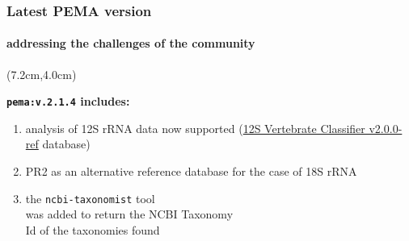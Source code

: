\documentclass{beamer}
\begin{document}
   \begin{frame}
      \frametitle{Latest PEMA version}
      \framesubtitle{addressing the challenges of the community}

      \begin{singlespace}


         \begin{textblock*}{5cm}(7.2cm,4.0cm) %
            
            \scriptsize

            \textbf{\texttt{pema:v.2.1.4} includes:}

            \begin{enumerate}
               \item analysis of 12S rRNA data now supported
                     (\href{https://github.com/terrimporter/12SvertebrateClassifier/releases}{12S Vertebrate Classifier v2.0.0-ref} database) 
               \item PR2 as an alternative reference 
                     database for the case of 18S rRNA 
               \item the \texttt{ncbi-taxonomist} tool \\ 
                     was added to return the NCBI Taxonomy \\ 
                     Id of the taxonomies found
            \end{enumerate}


\end{textblock*}
\end{singlespace}
\end{frame}
\end{document}
